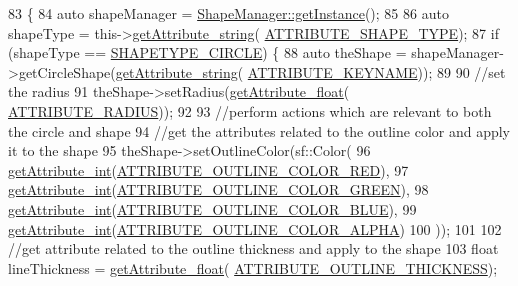 \begin{DoxyCode}
83                            \{
84     \textcolor{keyword}{auto} shapeManager = \hyperlink{class_shape_manager_a94d827d6ef5cd970b05886b95fd32ece}{ShapeManager::getInstance}();
85     
86     \textcolor{keyword}{auto} shapeType = this->\hyperlink{class_abstract_component_a4140957094ef40c4ffaa0ef381d00ce5}{getAttribute\_string}(
      \hyperlink{_a_e___attributes_8h_a4f8798cc305e537725c57bb8f47ba740}{ATTRIBUTE\_SHAPE\_TYPE});
87     \textcolor{keywordflow}{if} (shapeType == \hyperlink{_a_e___attributes_8h_ab5acdc705507cd35bfe5a25d403aaef7}{SHAPETYPE\_CIRCLE}) \{
88         \textcolor{keyword}{auto} theShape = shapeManager->getCircleShape(\hyperlink{class_abstract_component_a4140957094ef40c4ffaa0ef381d00ce5}{getAttribute\_string}(
      \hyperlink{_a_e___attributes_8h_a38d48cad306c55d90faa362aa5023de8}{ATTRIBUTE\_KEYNAME}));
89 
90         \textcolor{comment}{//set the radius}
91         theShape->setRadius(\hyperlink{class_abstract_component_a890ca92530f6b39afe8c261ce27709c7}{getAttribute\_float}(
      \hyperlink{_a_e___attributes_8h_a5b0feddcf4ea3df07d1a9a2f9dd3bf70}{ATTRIBUTE\_RADIUS}));
92 
93         \textcolor{comment}{//perform actions which are relevant to both the circle and shape}
94         \textcolor{comment}{//get the attributes related to the outline color and apply it to the shape}
95         theShape->setOutlineColor(sf::Color(
96             \hyperlink{class_abstract_component_a16ac644f742683149b78d01b787eb3bd}{getAttribute\_int}(\hyperlink{_a_e___attributes_8h_a6b45a750496a3996f9a59fb190c22597}{ATTRIBUTE\_OUTLINE\_COLOR\_RED}),
97             \hyperlink{class_abstract_component_a16ac644f742683149b78d01b787eb3bd}{getAttribute\_int}(\hyperlink{_a_e___attributes_8h_a63ec6f1bb23064d48d1e9443eae3e36c}{ATTRIBUTE\_OUTLINE\_COLOR\_GREEN}),
98             \hyperlink{class_abstract_component_a16ac644f742683149b78d01b787eb3bd}{getAttribute\_int}(\hyperlink{_a_e___attributes_8h_a6f224f25c3045b0c0ff6eb9ebfb75b85}{ATTRIBUTE\_OUTLINE\_COLOR\_BLUE}),
99             \hyperlink{class_abstract_component_a16ac644f742683149b78d01b787eb3bd}{getAttribute\_int}(\hyperlink{_a_e___attributes_8h_a5dc3e53458601ca0d4562198560c6e42}{ATTRIBUTE\_OUTLINE\_COLOR\_ALPHA})
100             ));
101         
102         \textcolor{comment}{//get attribute related to the outline thickness and apply to the shape}
103         \textcolor{keywordtype}{float} lineThickness = \hyperlink{class_abstract_component_a890ca92530f6b39afe8c261ce27709c7}{getAttribute\_float}(
      \hyperlink{_a_e___attributes_8h_ad658dbd44975ac4e266311f3ae29ab00}{ATTRIBUTE\_OUTLINE\_THICKNESS});

\end{DoxyCode}
